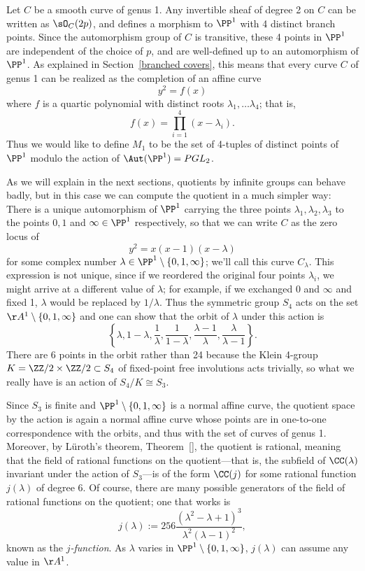 Let $C$ be a smooth curve of genus 1. Any invertible sheaf of degree 2 on $C$ can be written as
$\sO_C(2p)$, and defines
a morphism to $\PP^1$ with 4 distinct branch points. Since the automorphism group of $C$ is transitive,
these 4 points in $\PP^1$ are independent of the choice of $p$, and are well-defined
up to an automorphism of $\PP^1$.    As explained in Section~\ref{branched covers},  this means that every curve $C$ of genus 1 can be realized as the completion of an affine curve
$$
y^2 = f(x)
$$
where $f$ is a quartic polynomial with distinct roots $\lambda_1, \dots \lambda_4$; that is, 
$$
f(x) = \prod_{i=1}^4 (x - \lambda_i).
$$
Thus we would like to define $M_1$ to be the set of 4-tuples of distinct points of $\PP^1$ modulo the action of $\Aut(\PP^1) = PGL_2$.

As we will explain in the next sections, quotients by infinite groups can behave badly,
but in this case we can compute the quotient in a much simpler way:
There is a unique automorphism of $\PP^1$ carrying the three points $\lambda_1, \lambda_2,\lambda_3$ to the points $0, 1$ and $\infty \in \PP^1$ respectively, so that we can write $C$ as the zero locus of
$$
y^2 = x(x-1)(x-\lambda)
$$
for some complex number $\lambda  \in \PP^1 \setminus \{0,1,\infty\}$; we'll call this curve $C_\lambda$. 
This expression is not unique, since if we reordered the original  four points $\lambda_i$, we might arrive at a different value of $\lambda$; for example, if we exchanged 0 and $\infty$ and fixed 1, $\lambda$ would be replaced by $1/\lambda$. Thus the symmetric group $S_4$ acts on the set $\AA^1 \setminus \{0,1,\infty\}$
and one can show that the orbit of $\lambda$ under this action is
$$
 \left\{ \lambda, 1-\lambda, \frac{1}{\lambda}, \frac{1}{1-\lambda}, \frac{\lambda-1}{\lambda}, \frac{\lambda}{\lambda - 1} \right\}.
$$
There are 6 points in the orbit rather than 24 because the Klein 4-group
$K = \ZZ/2\times \ZZ/2 \subset S_4$ of fixed-point free involutions acts trivially, so what we really have is an action of $S_4/K \cong S_3$.

Since $S_3$ is finite and $\PP^1 \setminus \{0,1,\infty\}$ is a normal affine curve, the quotient space by the action is again a normal affine curve whose points are in one-to-one
correspondence with the orbits, and thus with the set of curves of genus 1. 
 Moreover, by L\"uroth's theorem, Theorem~\ref{}, the quotient is rational, meaning that the field of rational functions on the quotient---that is, the subfield of $\CC(\lambda)$ invariant under the action of $S_3$---is of the form $\CC(j)$ for some rational function $j(\lambda)$ of degree 6. Of course, there are many possible generators of the field of rational functions on the quotient; one that works is
\begin{equation}\label{formula for j}
j(\lambda) := 256\frac{(\lambda^2-\lambda + 1)^3}{\lambda^2(\lambda-1)^2},
\end{equation}
known as the \emph{$j$-function}. As $\lambda$ varies in $\PP^1 \setminus \{0,1,\infty\}$, $j(\lambda)$ can assume any value in $\AA^1$.
 
